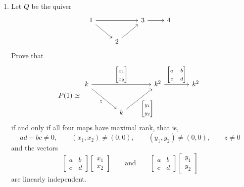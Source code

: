 \documentclass[11pt, a4paper]{article}
\begin{document}
\begin{enumerate}[leftmargin=*, label=\textbf{\arabic*.}]
\item Let $Q$ be the quiver
\[
    \begin{tikzcd}
        1 \arrow[rr] \arrow[rd] &              & 3 \arrow[r] & 4 \\
                                & 2 \arrow[ru] &             &  
        \end{tikzcd}
\]
Prove that
\[
P(1)\simeq
\begin{tikzcd}[ampersand replacement=\&, column sep=large, row sep=large]
k \arrow[rr, "{\begin{bmatrix}x_1\\x_2\end{bmatrix}}"] \arrow[dr, "z"'] \& \& k^2 \arrow[r, "{\begin{bmatrix}a&b\\ c&d\end{bmatrix}}"] \& k^2 \\
\& k \arrow[ur, "{\begin{bmatrix}y_1\\y_2\end{bmatrix}}"'] \&
\end{tikzcd}
\]
if and only if all four maps have maximal rank, that is,
\[
ad-bc\neq 0,\qquad (x_1,x_2)\neq (0,0),\qquad (y_1,y_2)\neq (0,0),\qquad z\neq 0
\]
and the vectors
\[
\begin{bmatrix}a&b\\ c&d\end{bmatrix}
\begin{bmatrix}x_1\\x_2\end{bmatrix}
\qquad\text{and}\qquad
\begin{bmatrix}a&b\\ c&d\end{bmatrix}
\begin{bmatrix}y_1\\y_2\end{bmatrix}
\]
are linearly independent.


\end{enumerate}
\end{document}
